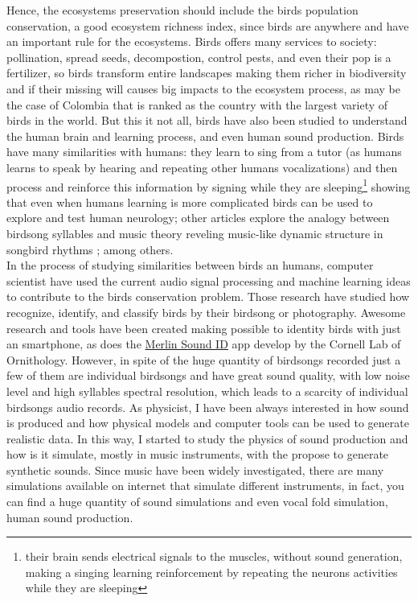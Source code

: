 Hence, the ecosystems preservation should include the birds population conservation, a good ecosystem richness index, since birds are anywhere and have an important rule for the ecosystems. Birds offers many services to society: pollination, spread seeds, decompostion, control pests, and even their pop is a fertilizer, so birds transform entire landscapes making them richer in biodiversity and if their missing will causes big impacts to the ecosystem process, as may be the case of Colombia that is ranked as the country with the largest variety of birds in the world. But this it not all, birds have also been studied to understand the human brain and learning process, and even human sound production. Birds have many similarities with humans: they learn to sing from a tutor \cite{tutor} (as humans learns to speak by hearing and repeating other humans vocalizations) and then process and reinforce this information by signing while they are sleeping\footnote{their brain sends electrical signals to the muscles, without sound generation, making a singing learning reinforcement by repeating the neurons activities while they are sleeping} \cite{brain_to_syllables, sleep} showing that even when humans learning is more complicated birds can be used to explore and test human neurology; other articles explore the analogy between birdsong syllables and music theory reveling music-like dynamic structure in songbird rhythms \cite{music_birdsongs}; among others. \\

In the process of studying similarities between birds an humans, computer scientist have used the current audio signal processing and machine learning ideas to contribute to the birds conservation problem. Those research have studied how recognize, identify, and classify birds by their birdsong or photography. Awesome research and tools have been created making possible to identity birds with just an smartphone, as does the \href{https://merlin.allaboutbirds.org/sound-id/}{Merlin Sound ID} app develop by the Cornell Lab of Ornithology. However, in spite of the huge quantity of birdsongs recorded just a few of them are individual birdsongs and have great sound quality, with low noise level and high syllables spectral resolution, which leads to a scarcity of individual birdsongs audio records. As physicist, I have been always interested in how sound is produced and how physical models and computer tools can be used to generate realistic data. In  this way, I started to study the physics of sound production and how is it simulate, mostly in music instruments, with the propose to generate synthetic sounds. Since music have been widely investigated, there are many simulations available on internet that simulate different instruments, in fact, you can find a huge quantity of sound simulations and even vocal fold simulation, human sound production.\\

